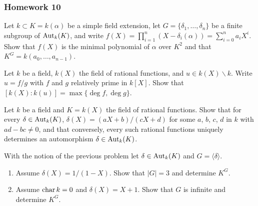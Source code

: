 \subsubsection{Homework 10}
\setcounter{exercise}{0}

\begin{problem}
  Let $k\subset K=k(\alpha)$ be a simple field extension, let
  $G=\{\delta_1,\dotsc,\delta_n\}$ be a finite subgroup of
  $\operatorname{Aut}_k(K)$, and write
  $f(X)=\prod_{i=1}^n(X-\delta_i(\alpha))=\sum_{i=0}^na_iX^i$. Show
  that $f(X)$ is the minimal polynomial of $\alpha$ over $K^2$ and that
  $K^G=k(a_0,\dotsc,a_{n-1})$.
\end{problem}
\begin{solution}
\end{solution}

\begin{problem}
  Let $k$ be a field, $k(X)$ the field of rational functions, and
  $u\in k(X)\smallsetminus k$. Write $u= f/g$ with $f$ and $g$
  relatively prime in $k[X]$. Show that
  $[k(X):k(u)]=\max\{\deg f,\deg g\}$.
\end{problem}
\begin{solution}
\end{solution}

\begin{problem}
  Let $k$ be a field and $K= k(X)$ the field of rational
  functions. Show that for every $\delta\in\operatorname{Aut}_k(K)$,
  $\delta(X)= (aX+b)/(cX+d)$ for some $a$, $b$, $c$, $d$ in $k$ with
  $ad-bc\neq 0$, and that conversely, every such rational functions
  uniquely determines an automorphism $\delta\in\operatorname{Aut}_k(K)$.
\end{problem}
\begin{solution}
\end{solution}

\begin{problem}
With the notion of the previous problem let $\delta\in\operatorname{Aut}_k(K)$ and
$G=\langle \delta \rangle$.
\begin{enumerate}[label=(\alph*),noitemsep]
\item Assume $\delta(X)=1/(1-X)$. Show that $|G|=3$ and determine $K^G$.
\item Assume $\operatorname{char} k=0$ and $\delta(X)=X+1$. Show that $G$ is infinite and
  determine $K^G$.
\end{enumerate}
\end{problem}
\begin{solution}
\end{solution}

